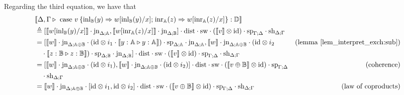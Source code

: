 \documentclass[10pt,a4paper]{amsart}
\theoremstyle{definition}
\theoremstyle{definition}
\theoremstyle{definition}
\theoremstyle{definition}
\theoremstyle{definition}
\theoremstyle{definition}
\begin{document}
Regarding the third equation, we have that
\begin{align*}
  & \llbracket \Delta,\Gamma \triangleright \text{ case } v \hspace{2pt} \{\text{inl}_{\mathbb{B}} (y) \Rightarrow w [ \text{inl}_{\mathbb{B}}(y)/x] ; \hspace{1pt} \text{inr}_{\mathbb{A}} (z) \Rightarrow w [ \text{inr}_{\mathbb{A}}(z)/x]\}: \mathbb{D}\rrbracket \\
  & \triangleq  [\llbracket  w [ \text{inl}_{\mathbb{B}}(y)/x] \rrbracket \cdot \text{jn}_{\Delta;\mathbb{A}} ,\llbracket  w [ \text{inr}_{\mathbb{A}}(z)/x] \rrbracket \cdot \text{jn}_{\Delta;\mathbb{B}} ] \cdot \text{dist} \cdot \text{sw}  \cdot (\llbracket v\rrbracket \otimes \text{id}) \cdot  \text{sp}_{\Gamma;\Delta} \cdot \text{sh}_{\Delta;\Gamma} \\
  & =  [\llbracket w \rrbracket \cdot \text{jn}_{\Delta;\mathbb{A} \oplus \mathbb{B}} \cdot (\text{id} \otimes i_1 \cdot  \llbracket y:\typeA \triangleright y:\typeA  \rrbracket) \cdot \text{sp}_{\Delta;\mathbb{A}} \cdot \text{jn}_{\Delta;\mathbb{A}}, 
  \llbracket w \rrbracket \cdot \text{jn}_{\Delta;\mathbb{A} \oplus \mathbb{B}} \cdot (\text{id} \otimes i_2  & {\text{(lemma \ref{lem_interpret_exch:sub})}} \\
  &  \hspace{10pt} \cdot \llbracket z:\typeB \triangleright z:\typeB  \rrbracket) \cdot \text{sp}_{\Delta;\mathbb{B}} \cdot \text{jn}_{\Delta;\mathbb{B}} ] \cdot \text{dist} \cdot \text{sw} \cdot (\llbracket v\rrbracket \otimes \text{id}) \cdot  \text{sp}_{\Gamma;\Delta} \cdot \text{sh}_{\Delta;\Gamma}  \\
  & = [\llbracket w \rrbracket \cdot \text{jn}_{\Delta;\mathbb{A} \oplus \mathbb{B}} \cdot (\text{id} \otimes i_1) , \llbracket  w \rrbracket  \cdot \text{jn}_{\Delta;\mathbb{A} \oplus \mathbb{B}}   \cdot (\text{id} \otimes i_2) ] \cdot \text{dist} \cdot \text{sw}  \cdot (\llbracket v \oplus \mathbb{B}\rrbracket \otimes \text{id})  \cdot  \text{sp}_{\Gamma;\Delta}  & {\text{(coherence)}}   \\
  & \hspace{10pt}  \cdot \text{sh}_{\Delta;\Gamma} \\
  & = \llbracket w \rrbracket \cdot \text{jn}_{\Delta;\mathbb{A} \oplus \mathbb{B}} \cdot [\text{id} \otimes i_1, \text{id} \otimes i_2] \cdot \text{dist} \cdot \text{sw}  \cdot (\llbracket v \oplus \mathbb{B}\rrbracket \otimes \text{id})  \cdot  \text{sp}_{\Gamma;\Delta} \cdot \text{sh}_{\Delta;\Gamma}  & {\text{(law of coproducts)}}  \\

\end{align*}
\end{document}
